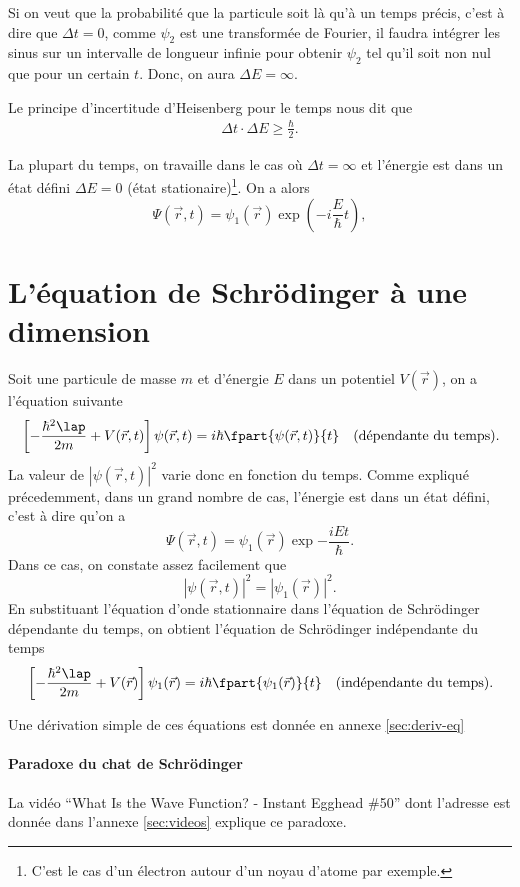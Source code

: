 Si on veut que la probabilité que la particule soit là qu'à un temps précis,
c'est à dire que $\Delta t = 0$,
comme $\psi_2$ est une transformée de Fourier, il faudra intégrer les sinus
sur un intervalle de longueur infinie
pour obtenir $\psi_2$ tel qu'il soit non nul que pour un certain $t$.
Donc, on aura $\Delta E = \infty$.

Le principe d'incertitude d'Heisenberg pour le temps nous dit que
\begin{align*}
  \Delta t \cdot \Delta E \geq \frac{\hbar}{2}.
\end{align*}

La plupart du temps, on travaille dans le cas où
$\Delta t = \infty$ et l'énergie est dans un état défini $\Delta E = 0$
(état stationaire)\footnote{C'est le
cas d'un électron autour d'un noyau d'atome par exemple.}.
On a alors
\[ \Psi(\vec{r}, t) = \psi_1(\vec{r}) \exp\left(-i\frac{E}{\hbar}t\right), \]

\section{L'équation de Schrödinger à une dimension}
Soit une particule de masse $m$ et d'énergie $E$ dans un potentiel $V(\vec{r})$,
on a l'équation suivante
\begin{align*}
	& \left[-\frac{\hbar^2\lap}{2m} + V(\vec{r},t)\right]\psi(\vec{r},t) = i\hbar\fpart{\psi(\vec{r},t)}{t}
	& \text{(dépendante du temps)}.
\end{align*}
La valeur de $|\psi(\vec{r},t)|^2$ varie donc en fonction du temps.
Comme expliqué précedemment, dans un grand nombre de cas, l'énergie
est dans un état défini, c'est à dire qu'on a
\[ \Psi(\vec{r},t) = \psi_1(\vec{r})\exp{-\frac{iEt}{\hbar}}.\]
Dans ce cas, on constate assez facilement que
\[ |\psi(\vec{r},t)|^2 = |\psi_1(\vec{r})|^2.\]
En substituant l'équation d'onde stationnaire dans
l'équation de Schrödinger dépendante du temps, on obtient l'équation
de Schrödinger indépendante du temps
\begin{align*}
	& \left[-\frac{\hbar^2\lap}{2m} + V(\vec{r})\right]\psi_1(\vec{r}) = i\hbar\fpart{\psi_1(\vec{r})}{t}
	& \text{(indépendante du temps)}.
\end{align*}

Une dérivation simple de ces équations est donnée en annexe \ref{sec:deriv-eq}

\paragraph{Paradoxe du chat de Schrödinger}
La vidéo ``What Is the Wave Function? - Instant Egghead \#50'' dont
l'adresse est donnée dans l'annexe \ref{sec:videos} explique
ce paradoxe.

